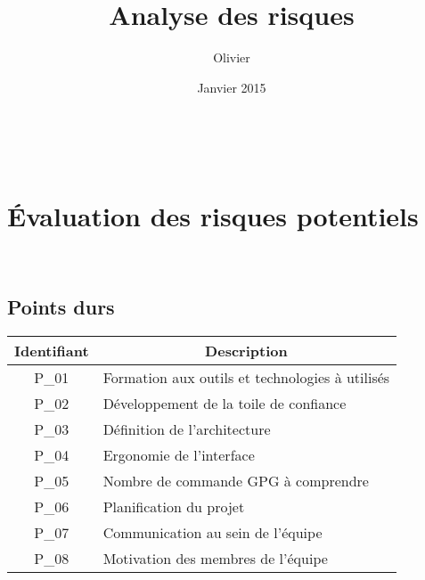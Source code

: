 \documentclass{../res/univ-projet}
\title{Analyse des risques}
\author{Olivier \bsc{Thibault}}
\date{Janvier 2015}
\begin{document}
\maketitle
\newpage
~
\tableofcontents
\newpage

\section{Évaluation des risques potentiels} ~\\
\subsection{Points durs}
	\begin{tabular}{| c | l |} 
		\hline
		\multicolumn{1}{|c|}{\cellcolor{blue} \color{white}Identifiant} & \multicolumn{1}{c|}{\cellcolor{blue} \color{white}Description} \\ \hline
		P\_01 & Formation aux outils et technologies à utilisés \\ \hline
		P\_02 & Développement de la toile de confiance \\ \hline
		P\_03 & Définition de l'architecture \\ \hline
		P\_04 & Ergonomie de l'interface \\ \hline
		P\_05 & Nombre de commande GPG à comprendre \\ \hline
		P\_06 & Planification du projet \\ \hline
		P\_07 & Communication au sein de l'équipe \\ \hline
		P\_08 & Motivation des membres de l'équipe \\ \hline
	\end{tabular} \\
	
\end{document}
